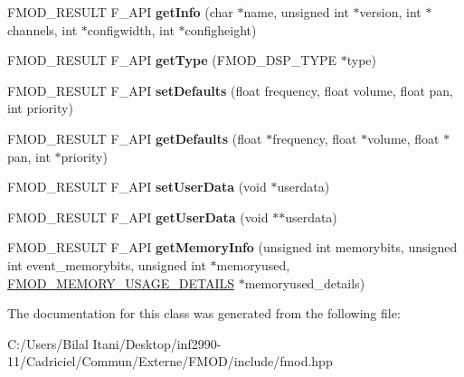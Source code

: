 \begin{DoxyCompactItemize}
\item 
F\+M\+O\+D\+\_\+\+R\+E\+S\+U\+LT F\+\_\+\+A\+PI {\bfseries get\+Info} (char $\ast$name, unsigned int $\ast$version, int $\ast$channels, int $\ast$configwidth, int $\ast$configheight)\hypertarget{class_f_m_o_d_1_1_d_s_p_a5bb61015d7b0e835437e46ea4eaf6442}{}\label{class_f_m_o_d_1_1_d_s_p_a5bb61015d7b0e835437e46ea4eaf6442}

\item 
F\+M\+O\+D\+\_\+\+R\+E\+S\+U\+LT F\+\_\+\+A\+PI {\bfseries get\+Type} (F\+M\+O\+D\+\_\+\+D\+S\+P\+\_\+\+T\+Y\+PE $\ast$type)\hypertarget{class_f_m_o_d_1_1_d_s_p_a7241c2669554667f90d4f2a576f64c4a}{}\label{class_f_m_o_d_1_1_d_s_p_a7241c2669554667f90d4f2a576f64c4a}

\item 
F\+M\+O\+D\+\_\+\+R\+E\+S\+U\+LT F\+\_\+\+A\+PI {\bfseries set\+Defaults} (float frequency, float volume, float pan, int priority)\hypertarget{class_f_m_o_d_1_1_d_s_p_a97919dbf4f783369b75f1bc43527489d}{}\label{class_f_m_o_d_1_1_d_s_p_a97919dbf4f783369b75f1bc43527489d}

\item 
F\+M\+O\+D\+\_\+\+R\+E\+S\+U\+LT F\+\_\+\+A\+PI {\bfseries get\+Defaults} (float $\ast$frequency, float $\ast$volume, float $\ast$pan, int $\ast$priority)\hypertarget{class_f_m_o_d_1_1_d_s_p_a80aa58e2f153dd3ad5fb6bf9305fc00e}{}\label{class_f_m_o_d_1_1_d_s_p_a80aa58e2f153dd3ad5fb6bf9305fc00e}

\item 
F\+M\+O\+D\+\_\+\+R\+E\+S\+U\+LT F\+\_\+\+A\+PI {\bfseries set\+User\+Data} (void $\ast$userdata)\hypertarget{class_f_m_o_d_1_1_d_s_p_a5aacd4725dbe50b725146bd6c412b0f4}{}\label{class_f_m_o_d_1_1_d_s_p_a5aacd4725dbe50b725146bd6c412b0f4}

\item 
F\+M\+O\+D\+\_\+\+R\+E\+S\+U\+LT F\+\_\+\+A\+PI {\bfseries get\+User\+Data} (void $\ast$$\ast$userdata)\hypertarget{class_f_m_o_d_1_1_d_s_p_a1b9014166d1ad45923da3227d8db3439}{}\label{class_f_m_o_d_1_1_d_s_p_a1b9014166d1ad45923da3227d8db3439}

\item 
F\+M\+O\+D\+\_\+\+R\+E\+S\+U\+LT F\+\_\+\+A\+PI {\bfseries get\+Memory\+Info} (unsigned int memorybits, unsigned int event\+\_\+memorybits, unsigned int $\ast$memoryused, \hyperlink{struct_f_m_o_d___m_e_m_o_r_y___u_s_a_g_e___d_e_t_a_i_l_s}{F\+M\+O\+D\+\_\+\+M\+E\+M\+O\+R\+Y\+\_\+\+U\+S\+A\+G\+E\+\_\+\+D\+E\+T\+A\+I\+LS} $\ast$memoryused\+\_\+details)\hypertarget{class_f_m_o_d_1_1_d_s_p_acac5f7f04e8e67719a712f848793e8f8}{}\label{class_f_m_o_d_1_1_d_s_p_acac5f7f04e8e67719a712f848793e8f8}

\end{DoxyCompactItemize}


The documentation for this class was generated from the following file\+:\begin{DoxyCompactItemize}
\item 
C\+:/\+Users/\+Bilal Itani/\+Desktop/inf2990-\/11/\+Cadriciel/\+Commun/\+Externe/\+F\+M\+O\+D/include/fmod.\+hpp\end{DoxyCompactItemize}
